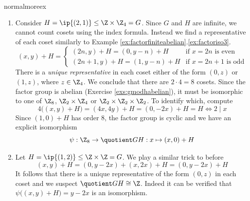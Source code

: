 \begin{examples}{}{normalmoreex}
\begin{enumerate}
	  
	  \item Consider $H=\ip{(2,1)}\le\Z\times\Z_4=G$. Since $G$ and $H$ are infinite, we cannot count cosets using the index formula. Instead we find a representative of each coset similarly to Example \ref*{ex:factorfiniteabelian}.\ref{ex:factoriso3}.
	  \[
	  	(x,y)+H=
	  	\begin{cases}
	  		(2n,y)+H=(0,y-n)+H&\text{if $x=2n$ is even}\\
	  		(2n+1,y)+H=(1,y-n)+H&\text{if $x=2n+1$ is odd}
	  	\end{cases}
	  \]
	  There is a \emph{unique representative} in each coset either of the form $(0,z)$ or $(1,z)$, where $z\in\Z_4$. We conclude that there are $2\cdot 4=8$ cosets. Since the factor group is abelian (Exercise \ref{exs:gmodhabelian}), it must be isomorphic to one of $\Z_8$, $\Z_2\times\Z_4$ or $\Z_2\times\Z_2\times\Z_2$. To identify which, compute
	  \[
	  	4\bigl((x,y)+H\bigr)=(4x,4y)+H=(0,-2x)+H=H \iff 2\mid x
	  \]
	  Since $(1,0)+H$ has order 8, the factor group is cyclic and we have an explicit isomorphism
	  \[
	  	\psi:\Z_8\to\quotient GH:x\mapsto (x,0)+H
	  \]
	  
	  \item\label{ex:hardgmodh} Let $H=\ip{(1,2)}\le\Z\times\Z=G$. We play a similar trick to before
	  \[
	  	(x,y)+H =(0,y-2x)+(x,2x)+H =(0,y-2x)+H
	  \]
	  It follows that there is a unique representative of the form $(0,z)$ in each coset and we suspect $\quotient GH\cong\Z$. Indeed it can be verified that $\psi\bigl((x,y)+H\bigr)=y-2x$ is an isomorphism. 
	
		

\end{enumerate}
\end{examples}
